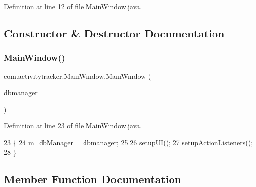 Definition at line 12 of file Main\+Window.\+java.



\subsection{Constructor \& Destructor Documentation}
\mbox{\label{classcom_1_1activitytracker_1_1_main_window_ae6bdfbe608d54293b9102ca3fe6cdcdc}} 
\subsubsection{\texorpdfstring{Main\+Window()}{MainWindow()}}
{\footnotesize\ttfamily com.\+activitytracker.\+Main\+Window.\+Main\+Window (\begin{DoxyParamCaption}\item[{\mbox{\hyperlink{classcom_1_1activitytracker_1_1_d_b_manager}{D\+B\+Manager}}}]{dbmanager }\end{DoxyParamCaption})\hspace{0.3cm}{\ttfamily [package]}}



Definition at line 23 of file Main\+Window.\+java.


\begin{DoxyCode}
23                                     \{
24         \mbox{\hyperlink{classcom_1_1activitytracker_1_1_main_window_ab2af51cb35794567e55564a4d3abbb79}{m\_dbManager}} = dbmanager;
25 
26         \mbox{\hyperlink{classcom_1_1activitytracker_1_1_main_window_a53a019623a37b950473359fc625b6423}{setupUI}}();
27         \mbox{\hyperlink{classcom_1_1activitytracker_1_1_main_window_a76b3e8567b228ccd26f09c15ebaddb72}{setupActionListeners}}();
28     \}
\end{DoxyCode}


\subsection{Member Function Documentation}
\mbox{\label{classcom_1_1activitytracker_1_1_main_window_a62e9c6f477ccc5b93aff33abb567fde4}} 
